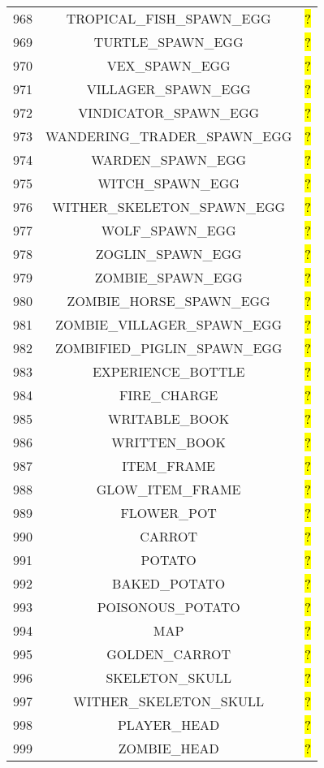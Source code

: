 \documentclass[11pt]{article}
\newcommand\myworries[1]{\sethlcolor{red}\hl{#1}}
\begin{document}
\begin{longtable}{ |c|c|c| }
968 & TROPICAL\_FISH\_SPAWN\_EGG & \myworries{?} \\
969 & TURTLE\_SPAWN\_EGG & \myworries{?} \\
970 & VEX\_SPAWN\_EGG & \myworries{?} \\
971 & VILLAGER\_SPAWN\_EGG & \myworries{?} \\
972 & VINDICATOR\_SPAWN\_EGG & \myworries{?} \\
973 & WANDERING\_TRADER\_SPAWN\_EGG & \myworries{?} \\
974 & WARDEN\_SPAWN\_EGG & \myworries{?} \\
975 & WITCH\_SPAWN\_EGG & \myworries{?} \\
976 & WITHER\_SKELETON\_SPAWN\_EGG & \myworries{?} \\
977 & WOLF\_SPAWN\_EGG & \myworries{?} \\
978 & ZOGLIN\_SPAWN\_EGG & \myworries{?} \\
979 & ZOMBIE\_SPAWN\_EGG & \myworries{?} \\
980 & ZOMBIE\_HORSE\_SPAWN\_EGG & \myworries{?} \\
981 & ZOMBIE\_VILLAGER\_SPAWN\_EGG & \myworries{?} \\
982 & ZOMBIFIED\_PIGLIN\_SPAWN\_EGG & \myworries{?} \\
983 & EXPERIENCE\_BOTTLE & \myworries{?} \\
984 & FIRE\_CHARGE & \myworries{?} \\
985 & WRITABLE\_BOOK & \myworries{?} \\
986 & WRITTEN\_BOOK & \myworries{?} \\
987 & ITEM\_FRAME & \myworries{?} \\
988 & GLOW\_ITEM\_FRAME & \myworries{?} \\
989 & FLOWER\_POT & \myworries{?} \\
990 & CARROT & \myworries{?} \\
991 & POTATO & \myworries{?} \\
992 & BAKED\_POTATO & \myworries{?} \\
993 & POISONOUS\_POTATO & \myworries{?} \\
994 & MAP & \myworries{?} \\
995 & GOLDEN\_CARROT & \myworries{?} \\
996 & SKELETON\_SKULL & \myworries{?} \\
997 & WITHER\_SKELETON\_SKULL & \myworries{?} \\
998 & PLAYER\_HEAD & \myworries{?} \\
999 & ZOMBIE\_HEAD & \myworries{?} \\

\end{longtable}
\end{document}
